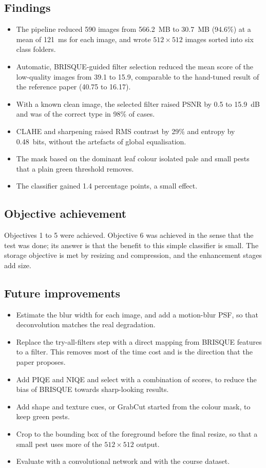 \documentclass[12pt,a4paper]{article}
\begin{document}
\subsection{Findings}
\begin{itemize}[nosep]
\item The pipeline reduced 590 images from 566.2~MB to 30.7~MB (94.6\%) at a mean of 121~ms for each image, and wrote $512\times512$ images sorted into six class folders.
\item Automatic, BRISQUE-guided filter selection reduced the mean score of the low-quality images from 39.1 to 15.9, comparable to the hand-tuned result of the reference paper (40.75 to 16.17).
\item With a known clean image, the selected filter raised PSNR by 0.5 to 15.9~dB and was of the correct type in 98\% of cases.
\item CLAHE and sharpening raised RMS contrast by 29\% and entropy by 0.48~bits, without the artefacts of global equalisation.
\item The mask based on the dominant leaf colour isolated pale and small pests that a plain green threshold removes.
\item The classifier gained 1.4 percentage points, a small effect.
\end{itemize}

\subsection{Objective achievement}
Objectives 1 to 5 were achieved. Objective 6 was achieved in the sense that the test was done; its answer is that the benefit to this simple classifier is small. The storage objective is met by resizing and compression, and the enhancement stages add size.

\subsection{Future improvements}
\begin{itemize}[nosep]
\item Estimate the blur width for each image, and add a motion-blur PSF, so that deconvolution matches the real degradation.
\item Replace the try-all-filters step with a direct mapping from BRISQUE features to a filter. This removes most of the time cost and is the direction that the paper proposes.
\item Add PIQE and NIQE and select with a combination of scores, to reduce the bias of BRISQUE towards sharp-looking results.
\item Add shape and texture cues, or GrabCut started from the colour mask, to keep green pests.
\item Crop to the bounding box of the foreground before the final resize, so that a small pest uses more of the $512\times512$ output.
\item Evaluate with a convolutional network and with the course dataset.
\end{itemize}
\end{document}
